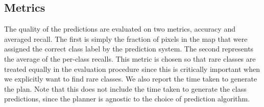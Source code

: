 \subsection{Metrics}
The quality of the predictions are evaluated on two metrics, accuracy and averaged recall. The first is simply the fraction of pixels in the map that were assigned the correct class label by the prediction system. The second represents the average of the per-class recalls. This metric is chosen so that rare classes are treated equally in the evaluation procedure since this is critically important when we explicitly want to find rare classes. We also report the time taken to generate the plan. Note that this does not include the time taken to generate the class predictions, since the planner is agnostic to the choice of prediction algorithm.

 
